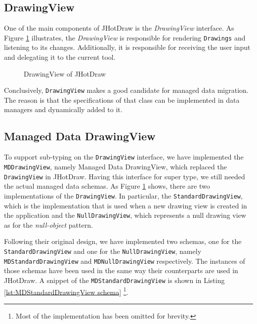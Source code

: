 \subsection{DrawingView}
One of the main components of JHotDraw is the \textit{DrawingView} interface.
As Figure \ref{fig:JHotDraw_DrawingView} illustrates, the \textit{DrawingView} is responsible for rendering \texttt{Drawings} and listening to its changes.
Additionally, it is responsible for receiving the user input and delegating it to the current tool.

\begin{figure}[H]
	\centering
  	\caption{DrawingView of JHotDraw}
  	\label{fig:JHotDraw_DrawingView}
\end{figure}

Conclusively, \texttt{DrawingView} makes a good candidate for managed data migration.
The reason is that the specifications of that class can be implemented in data managers and dynamically added to it.

\subsection{Managed Data DrawingView}
To support sub-typing on the \texttt{DrawingView} interface, we have implemented the \texttt{MDDrawingView}, namely Managed Data DrawingView, which replaced the \texttt{DrawingView} in JHotDraw.
Having this interface for super type, we still needed the actual managed data schemas.
As Figure \ref{fig:JHotDraw_DrawingView} shows, there are two implementations of the \texttt{DrawingView}.
In particular, the \texttt{StandardDrawingView}, which is the implementation that is used when a new drawing view is created in the application and the \texttt{NullDrawingView}, which represents a null drawing view as for the \textit{null-object} pattern.

Following their original design, we have implemented two schemas, one for the \texttt{StandardDrawingView} and one for the \texttt{NullDrawingView}, namely \texttt{MDStandardDrawingView} and \texttt{MDNullDrawingView} respectively.
The instances of those schemas have been used in the same way their counterparts are used in JHotDraw.
A snippet of the \texttt{MDStandardDrawingView} is shown in Listing \ref{lst:MDStandardDrawingView schema} \footnote{Most of the implementation has been omitted for brevity.}.

